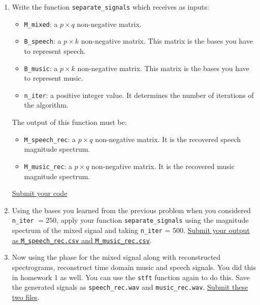 \begin{enumerate}
    \item Write the function \texttt{separate\_signals} which receives as inputs:
    \begin{itemize}
        \item \texttt{M\_mixed}: a $p \times q$ non-negative matrix. 
        \item \texttt{B\_speech}:  a $p \times k$ non-negative matrix. This matrix is the bases you have to represent speech.
        \item \texttt{B\_music}: a $p \times k$ non-negative matrix. This matrix is the bases you have to represent music.
        \item \texttt{n\_iter}: a positive integer value. It determines the number of iterations of the algorithm.
    \end{itemize}
    The output of this function must be:
    \begin{itemize}
        \item \texttt{M\_speech\_rec}: a $p \times q$ non-negative matrix. It is the recovered speech magnitude spectrum.
        \item \texttt{M\_music\_rec}: a $p \times q$ non-negative matrix. It is the recovered music magnitude spectrum.
    \end{itemize}
    \ul{Submit your code}
    
    \item Using the bases you learned from the previous problem when you considered \texttt{n\_iter} $= 250$, apply your function \texttt{separate\_signals} using the magnitude spectrum of the mixed signal and taking \texttt{n\_iter} = 500. \ul{Submit your output as \texttt{M\_speech\_rec.csv} and \texttt{M\_music\_rec.csv}}.
    
    
    \item Now using the phase for the mixed signal along with reconstructed spectrograms, reconstruct time domain music and speech signals. You did this in homework 1 as well. You can use the \texttt{stft} function again to do this. Save the generated signals as \texttt{speech\_rec.wav} and \texttt{music\_rec.wav}. \ul{Submit these two files}.
    
    
\end{enumerate}
 













